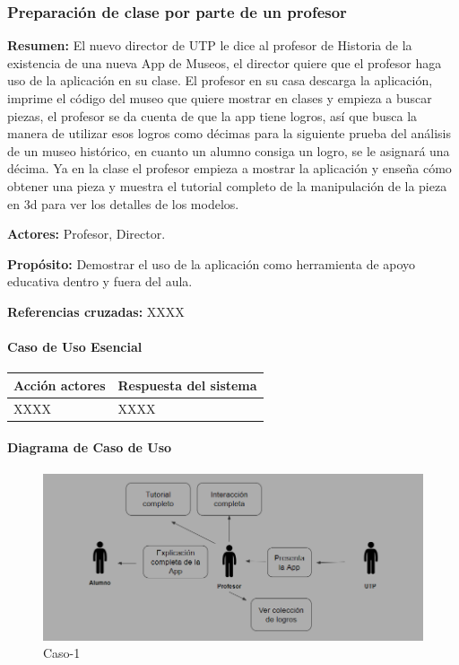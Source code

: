 \subsubsection{Preparación de clase por parte de un profesor}

{\textbf {Resumen:}}
El nuevo director de UTP le dice al profesor de Historia de la existencia de una nueva App de Museos, el director quiere que el profesor haga uso de la aplicación en su clase. El profesor en su casa descarga la aplicación, imprime el código del museo que quiere mostrar en clases y empieza a buscar piezas, el profesor se da cuenta de que la app tiene logros, así que busca la manera de utilizar esos logros como décimas para la siguiente prueba del análisis de un museo histórico, en cuanto un alumno consiga un logro, se le asignará una décima. Ya en la clase el profesor empieza a mostrar la aplicación y enseña cómo obtener una pieza y muestra el tutorial completo de la manipulación de la pieza en 3d para ver los detalles de los modelos.


{\textbf {Actores:}}
Profesor, Director.

{\textbf {Propósito:}}
Demostrar el uso de la aplicación como herramienta de apoyo educativa dentro y fuera del aula.

{\textbf {Referencias cruzadas:}}
XXXX

\paragraph{Caso de Uso Esencial}

\begin{longtable}{|p{5cm}|p{8cm}|}
\hline 
Acción actores & Respuesta del sistema \\ 
\hline 
XXXX & XXXX \\ 
\hline 
\end{longtable}

\paragraph{Diagrama de Caso de Uso}

\begin{figure}[H]
\centerline{\includegraphics[width=15cm]{imgs/CasoUso_8.PNG}}
\caption{Caso-1}
\label{fig}
\end{figure}

